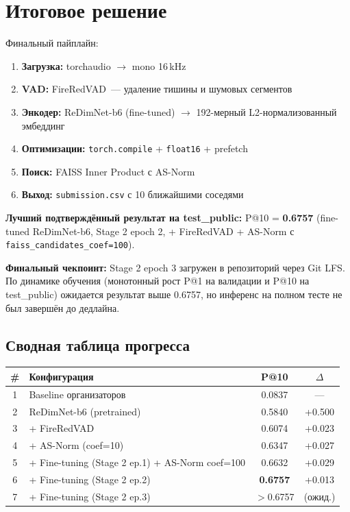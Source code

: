\documentclass[12pt,a4paper]{article}
\begin{document}
\section{Итоговое решение}

Финальный пайплайн:

\begin{enumerate}
  \item \textbf{Загрузка:} torchaudio $\rightarrow$ mono 16\,kHz
  \item \textbf{VAD:} FireRedVAD~--- удаление тишины и шумовых сегментов
  \item \textbf{Энкодер:} ReDimNet-b6 (fine-tuned) $\rightarrow$ 192-мерный L2-нормализованный эмбеддинг
  \item \textbf{Оптимизации:} \texttt{torch.compile} + \texttt{float16} + prefetch
  \item \textbf{Поиск:} FAISS Inner Product с AS-Norm
  \item \textbf{Выход:} \texttt{submission.csv} с 10 ближайшими соседями
\end{enumerate}

\textbf{Лучший подтверждённый результат на test\_public:} P@10 = \textbf{0.6757} (fine-tuned ReDimNet-b6, Stage 2 epoch 2, + FireRedVAD + AS-Norm с \texttt{faiss\_candidates\_coef=100}).

\textbf{Финальный чекпоинт:} Stage 2 epoch 3 загружен в репозиторий через Git LFS. По динамике обучения (монотонный рост P@1 на валидации и P@10 на test\_public) ожидается результат выше 0.6757, но инференс на полном тесте не был завершён до дедлайна.

\subsection{Сводная таблица прогресса}

\begin{tabular}{c l c c}
\hline
\# & Конфигурация & P@10 & $\Delta$ \\
\hline
1 & Baseline организаторов & 0.0837 & --- \\
2 & ReDimNet-b6 (pretrained) & 0.5840 & +0.500 \\
3 & + FireRedVAD & 0.6074 & +0.023 \\
4 & + AS-Norm (coef=10) & 0.6347 & +0.027 \\
5 & + Fine-tuning (Stage 2 ep.1) + AS-Norm coef=100 & 0.6632 & +0.029 \\
6 & + Fine-tuning (Stage 2 ep.2) & \textbf{0.6757} & +0.013 \\
7 & + Fine-tuning (Stage 2 ep.3) & $>$0.6757 & (ожид.) \\
\hline
\end{tabular}
\end{document}
